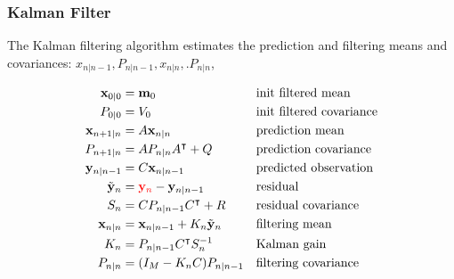 \begin{frame}
    \frametitle{Kalman Filter}

The Kalman filtering algorithm estimates the prediction and filtering means and
    covariances: $x_{n|n-1}, P_{n|n-1}, x_{n|n}, .P_{n|n}$,

\scriptsize
\begin{alignat*}{2}
    \mathbf{x}_{0|0}&=\mathbf{m}_0&&\text{init filtered mean}\\
    P_{0|0}&=V_0&&\text{init filtered covariance}\\
    \mathbf{x}_{n+1|n}&=A\mathbf{x}_{n|n}\quad&&\text{prediction mean}\\
    P_{n+1|n}&=AP_{n|n}A^\intercal+Q\quad&&\text{prediction covariance}\\
    \mathbf{y}_{n|n-1}&=C\mathbf{x}_{n|n-1}\quad&&\text{predicted observation}\\
    \tilde{\mathbf{y}}_n&=\textcolor{red}{\mathbf{y}_n}-\mathbf{y}_{n|n-1}\quad&&\text{residual}\\
    S_n&=CP_{n|n-1}C^\intercal+R\quad&&\text{residual covariance}\\
    \mathbf{x}_{n|n}&=\mathbf{x}_{n|n-1}+K_n\tilde{\mathbf{y}}_n\quad&&\text{filtering mean}\\
    K_n&=P_{n|n-1}C^\intercal S_n^{-1}&&\text{Kalman gain}\\
    P_{n|n}&=(I_M-K_nC)P_{n|n-1}&&\text{filtering covariance}
\end{alignat*}
\normalsize

\end{frame}

